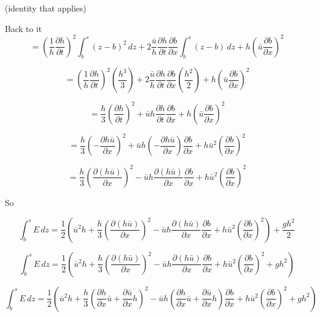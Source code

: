\documentclass[12pt]{article}
\begin{document}
(identity that applies)

Back to it
\[ = \left( \frac{1}{h}\frac{\partial h}{\partial t}\right)^2 \int_b^s  \left(z- b\right)^2  \, dz  +  2\frac{\bar{u}}{h}\frac{\partial h}{\partial t}\frac{\partial b}{\partial x}\int_b^s \left(z - b\right)  \, dz  + h\left( \bar{u} \frac{\partial b}{\partial x} \right)^2 \]

\[ = \left( \frac{1}{h}\frac{\partial h}{\partial t}\right)^2 \left(\frac{h^3}{3}\right) +  2\frac{\bar{u}}{h}\frac{\partial h}{\partial t}\frac{\partial b}{\partial x}\left(\frac{h^2}{2}\right)  + h\left( \bar{u} \frac{\partial b}{\partial x} \right)^2 \]

\[ = \frac{h}{3}\left(\frac{\partial h}{\partial t}\right)^2  + \bar{u}h  \frac{\partial h}{\partial t}\frac{\partial b}{\partial x}  + h\left( \bar{u} \frac{\partial b}{\partial x} \right)^2 \]

\[ = \frac{h}{3}\left( - \frac{\partial h\bar{u}}{\partial x}\right)^2  + \bar{u}h  \left(- \frac{\partial h\bar{u}}{\partial x}\right)\frac{\partial b}{\partial x}  + h\bar{u} ^2\left( \frac{\partial b}{\partial x} \right)^2 \]

\[ = \frac{h}{3}\left( \frac{\partial \left(h\bar{u}\right)}{\partial x}\right)^2  - \bar{u}h  \frac{\partial \left(h\bar{u}\right)}{\partial x}\frac{\partial b}{\partial x}  + h\bar{u} ^2\left( \frac{\partial b}{\partial x} \right)^2 \]

So

\[\int_b^sE \, dz  = \frac{1}{2}\left(\bar{u}^2h + \frac{h}{3}\left( \frac{\partial \left(h\bar{u}\right)}{\partial x}\right)^2  - \bar{u}h  \frac{\partial \left(h\bar{u}\right)}{\partial x}\frac{\partial b}{\partial x}  + h\bar{u} ^2\left( \frac{\partial b}{\partial x} \right)^2 \right) + \frac{gh^2}{2} \]

\[\int_b^sE \, dz  = \frac{1}{2} \left( \bar{u}^2h + \frac{h}{3}\left( \frac{\partial \left(h\bar{u}\right)}{\partial x}\right)^2  - \bar{u}h  \frac{\partial \left(h\bar{u}\right)}{\partial x}\frac{\partial b}{\partial x}  + h\bar{u} ^2\left( \frac{\partial b}{\partial x} \right)^2  + gh^2 \right)\]

\[\int_b^sE \, dz  = \frac{1}{2} \left( \bar{u}^2h + \frac{h}{3}\left(\frac{\partial h}{\partial x}\bar{u} + \frac{\partial \bar{u}}{\partial x}h\right)^2  - \bar{u}h  \left(\frac{\partial h}{\partial x}\bar{u} + \frac{\partial \bar{u}}{\partial x}h\right)\frac{\partial b}{\partial x}  + h\bar{u} ^2\left( \frac{\partial b}{\partial x} \right)^2   + gh^2 \right)\]
\end{document}
